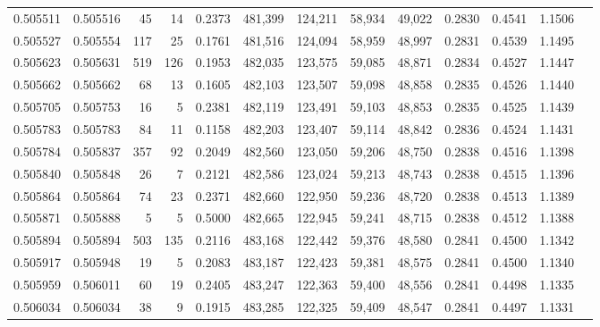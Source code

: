 \begin{tabular}{rrrrrrrrrrrrr}
0.505511 & 0.505516 &    45 &    14 &                                     0.2373 & 481,399 & 124,211 &  58,934 &  49,022 & 0.2830 & 0.4541 & 1.1506 \\
0.505527 & 0.505554 &   117 &    25 &                                     0.1761 & 481,516 & 124,094 &  58,959 &  48,997 & 0.2831 & 0.4539 & 1.1495 \\
0.505623 & 0.505631 &   519 &   126 &                                     0.1953 & 482,035 & 123,575 &  59,085 &  48,871 & 0.2834 & 0.4527 & 1.1447 \\
0.505662 & 0.505662 &    68 &    13 &                                     0.1605 & 482,103 & 123,507 &  59,098 &  48,858 & 0.2835 & 0.4526 & 1.1440 \\
0.505705 & 0.505753 &    16 &     5 &                                     0.2381 & 482,119 & 123,491 &  59,103 &  48,853 & 0.2835 & 0.4525 & 1.1439 \\
0.505783 & 0.505783 &    84 &    11 &                                     0.1158 & 482,203 & 123,407 &  59,114 &  48,842 & 0.2836 & 0.4524 & 1.1431 \\
0.505784 & 0.505837 &   357 &    92 &                                     0.2049 & 482,560 & 123,050 &  59,206 &  48,750 & 0.2838 & 0.4516 & 1.1398 \\
0.505840 & 0.505848 &    26 &     7 &                                     0.2121 & 482,586 & 123,024 &  59,213 &  48,743 & 0.2838 & 0.4515 & 1.1396 \\
0.505864 & 0.505864 &    74 &    23 &                                     0.2371 & 482,660 & 122,950 &  59,236 &  48,720 & 0.2838 & 0.4513 & 1.1389 \\
0.505871 & 0.505888 &     5 &     5 &                                     0.5000 & 482,665 & 122,945 &  59,241 &  48,715 & 0.2838 & 0.4512 & 1.1388 \\
0.505894 & 0.505894 &   503 &   135 &                                     0.2116 & 483,168 & 122,442 &  59,376 &  48,580 & 0.2841 & 0.4500 & 1.1342 \\
0.505917 & 0.505948 &    19 &     5 &                                     0.2083 & 483,187 & 122,423 &  59,381 &  48,575 & 0.2841 & 0.4500 & 1.1340 \\
0.505959 & 0.506011 &    60 &    19 &                                     0.2405 & 483,247 & 122,363 &  59,400 &  48,556 & 0.2841 & 0.4498 & 1.1335 \\
0.506034 & 0.506034 &    38 &     9 &                                     0.1915 & 483,285 & 122,325 &  59,409 &  48,547 & 0.2841 & 0.4497 & 1.1331 \\

\end{tabular}
